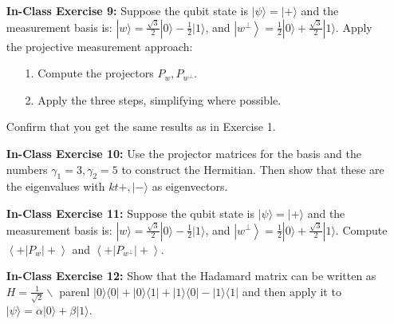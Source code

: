 \documentclass[main.tex]{subfiles}
\begin{document}
\begin{enumerate}
\item[] \textbf{In-Class Exercise 9:} Suppose the qubit state is $|\psi\rangle=|+\rangle$ and the measurement basis is: $|w\rangle=\frac{\sqrt{3}}{2}|0\rangle-\frac{1}{2}|1\rangle$, and $\left|w^{\perp}\right\rangle=\frac{1}{2}|0\rangle+\frac{\sqrt{3}}{2}|1\rangle$. Apply the projective measurement approach:

    \begin{enumerate}
        \item[1.] Compute the projectors $P_{w}, P_{w^{\perp}}$.
        \item[2.] Apply the three steps, simplifying where possible.
    \end{enumerate}
    
    Confirm that you get the same results as in Exercise 1.

\item[] \textbf{In-Class Exercise 10:} Use the projector matrices for the basis and the numbers $\gamma_{1}=3, \gamma_{2}=5$ to construct the Hermitian. Then show that these are the eigenvalues with $k t+,|-\rangle$ as eigenvectors.

\item[] \textbf{In-Class Exercise 11:} Suppose the qubit state is $|\psi\rangle=|+\rangle$ and the measurement basis is: $|w\rangle=\frac{\sqrt{3}}{2}|0\rangle-\frac{1}{2}|1\rangle$, and $\left|w^{\perp}\right\rangle=\frac{1}{2}|0\rangle+\frac{\sqrt{3}}{2}|1\rangle .$ Compute $\left\langle+\left|P_{w}\right|+\right\rangle$ and $\left\langle+\left|P_{w^{\perp}}\right|+\right\rangle .$

\item[] \textbf{In-Class Exercise 12:} Show that the Hadamard matrix can be written as $H=\frac{1}{\sqrt{2}} \backslash$ parenl $|0\rangle\langle 0|+| 0\rangle\langle 1|+| 1\rangle\langle 0|-| 1\rangle\langle 1|$ and then apply it to $|\psi\rangle=\alpha|0\rangle+\beta|1\rangle .$

\end{enumerate}
\end{document}
